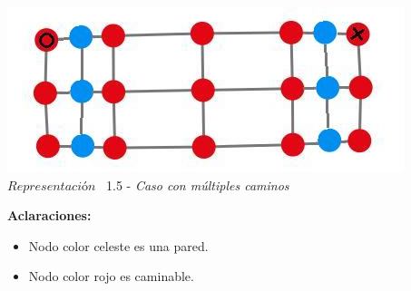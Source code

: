 \vspace*{0.3cm} \vspace*{0.3cm}
  \begin{center}
 \includegraphics[scale=0.5]{./EJ1/ej1graforandom.jpeg}
 \\{$Representación$ \ 1.5 - \textit{Caso con m\'ultiples caminos}}
  \end{center}
  \vspace*{0.3cm}


\textbf{Aclaraciones:} 
\begin{itemize}
\item Nodo color celeste es una pared.
\item Nodo color rojo es caminable.
\end{itemize}
